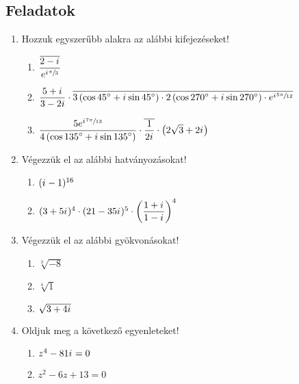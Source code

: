 \documentclass[a4paper, 12pt]{scrartcl}
\begin{document}
\clearpage
\subsection{Feladatok}

\begin{enumerate}
  \item Hozzuk egyszerűbb alakra az alábbi kifejezéseket!
        \begin{enumerate}
          \item $\dfrac{
                    \overline{2 - {i\mkern1mu}}
                  }{
                    e^{{i\mkern1mu} \sfrac{\pi}{3}}
                  }$
          \item $\dfrac{5 + \iu}{3 - 2i} \cdot \overline{
                    \rcisdeg*{3}{45} \cdot
                    \rcisdeg*{2}{270} \cdot
                    e^{\iu \sfrac{5\pi}{12}}
                  }$

          \item $\dfrac{
                    5 e^{\iu \sfrac{7\pi}{13}}
                  }{
                    \rcisdeg*{4}{135}
                  } \cdot \overline{
                    \dfrac{1}{2\iu}
                  } \cdot \left(
                  2 \sqrt{3} + 2 \iu
                  \right)
                $
        \end{enumerate}

  \item Végezzük el az alábbi hatványozásokat!
        \begin{enumerate}
          \item $({i\mkern1mu} - 1)^{16}$
          \item $(3 + 5{i\mkern1mu})^4 \cdot
                  (21 - 35{i\mkern1mu})^5 \cdot
                  \left(\dfrac{1 + {i\mkern1mu}}{1 - {i\mkern1mu}}\right)^4$
        \end{enumerate}

  \item Végezzük el az alábbi gyökvonásokat!
        \begin{enumerate}
          \item $\sqrt[3]{-8}$
          \item $\sqrt[4]{1}$
          \item $\sqrt{3 + 4{i\mkern1mu}}$
        \end{enumerate}

  \item Oldjuk meg a következő egyenleteket!
        \begin{enumerate}
          \item $z^4 - 81 {i\mkern1mu} = 0$
          \item $z^2 - 6z + 13 = 0$
        \end{enumerate}


\end{enumerate}
\end{document}
